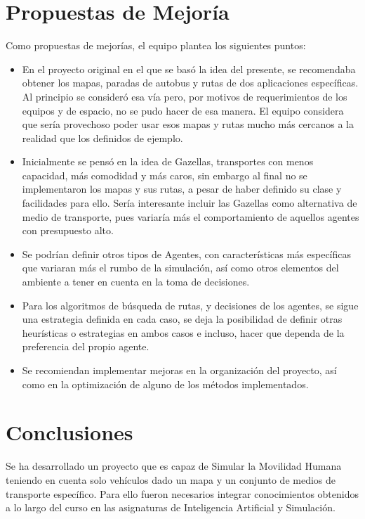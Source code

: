 \documentclass{article}
\begin{document}
\section{Propuestas de Mejoría}
Como propuestas de mejorías, el equipo plantea los siguientes puntos:
\begin{itemize}
    \item En el proyecto original en el que se basó la idea del presente, se recomendaba obtener los mapas, paradas de autobus y rutas de dos aplicaciones específicas. Al principio se consideró esa vía pero, por motivos de requerimientos de los equipos y de espacio, no se pudo hacer de esa manera. El equipo considera que sería provechoso poder usar esos mapas y rutas mucho más cercanos a la realidad que los definidos de ejemplo. 
    \item Inicialmente se pensó en la idea de Gazellas, transportes con menos capacidad, más comodidad y más caros, sin embargo al final no se implementaron los mapas y sus rutas, a pesar de haber definido su clase y facilidades para ello. Sería interesante incluir las Gazellas como alternativa de medio de transporte, pues variaría más el comportamiento de aquellos agentes con presupuesto alto. 
    \item Se podrían definir otros tipos de Agentes, con características más específicas que variaran más el rumbo de la simulación, así como otros elementos del ambiente a tener en cuenta en la toma de decisiones.
    \item Para los algoritmos de búsqueda de rutas, y decisiones de los agentes, se sigue una estrategia definida en cada caso, se deja la posibilidad de definir otras heurísticas o estrategias en ambos casos e incluso, hacer que dependa de la preferencia del propio agente.
    \item Se recomiendan implementar mejoras en la organización del proyecto, así como en la optimización de alguno de los métodos implementados.
\end{itemize}

\section{Conclusiones}
Se ha desarrollado un proyecto que es capaz de Simular la Movilidad Humana teniendo en cuenta solo vehículos dado un mapa y un conjunto de medios de transporte específico. Para ello fueron necesarios integrar conocimientos obtenidos a lo largo del curso en las asignaturas de Inteligencia Artificial y Simulación. 
\end{document}
